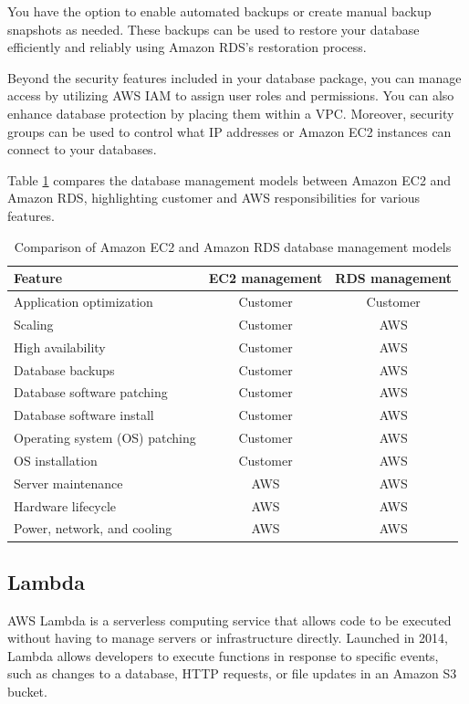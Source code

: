 You have the option to enable automated backups or create manual backup snapshots as needed. These backups can be used to restore your database efficiently and reliably using Amazon \ac{RDS}'s restoration process.

Beyond the security features included in your database package, you can manage access by utilizing \ac{AWS} \ac{IAM} to assign user roles and permissions. You can also enhance database protection by placing them within a \ac{VPC}. Moreover, security groups can be used to control what IP addresses or Amazon \ac{EC2} instances can connect to your databases.


Table \ref{tab:ec2vsrds} compares the database management models between Amazon \ac{EC2} and Amazon \ac{RDS}, highlighting customer and \ac{AWS} responsibilities for various features.

\begin{table}[ht]
    \centering
    \begin{tabular}{|l|c|c|}
    \hline
    \textbf{Feature} & \textbf{\ac{EC2} management} & \textbf{\ac{RDS} management} \\ \hline
    Application optimization & Customer & Customer \\ \hline
    Scaling & Customer & AWS \\ \hline
    High availability & Customer & AWS \\ \hline
    Database backups & Customer & AWS \\ \hline
    Database software patching & Customer & AWS \\ \hline
    Database software install & Customer & AWS \\ \hline
    Operating system (OS) patching & Customer & AWS \\ \hline
    OS installation & Customer & AWS \\ \hline
    Server maintenance & AWS & AWS \\ \hline
    Hardware lifecycle & AWS & AWS \\ \hline
    Power, network, and cooling & AWS & AWS \\ \hline
    \end{tabular}
    \caption{Comparison of Amazon \ac{EC2} and Amazon \ac{RDS} database management models}
    \label{tab:ec2vsrds}
\end{table}

\subsection{Lambda}
\ac{AWS} Lambda is a serverless computing service that allows code to be executed without having to manage servers or infrastructure directly. Launched in 2014, Lambda allows developers to execute functions in response to specific events, such as changes to a database, \ac{HTTP} requests, or file updates in an Amazon \ac{S3} bucket.

